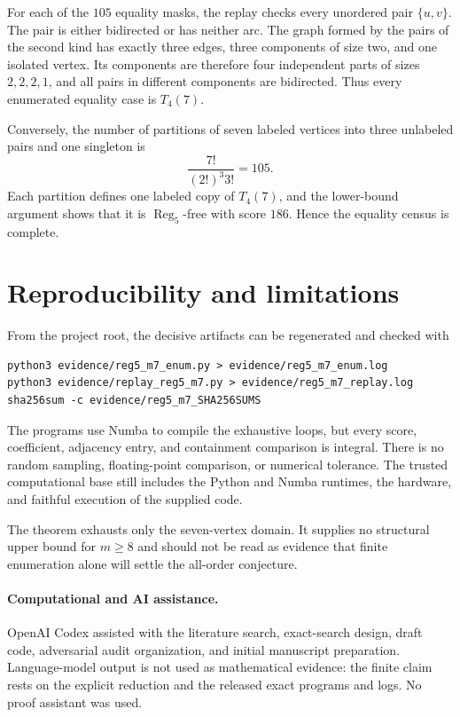 \documentclass[11pt]{article}
\newcommand{\Reg}{\operatorname{Reg}_5}
\begin{document}
For each of the $105$ equality masks, the replay checks every unordered pair
$\{u,v\}$.  The pair is either bidirected or has neither arc.  The graph formed
by the pairs of the second kind has exactly three edges, three components of
size two, and one isolated vertex.  Its components are therefore four
independent parts of sizes $2,2,2,1$, and all pairs in different components
are bidirected.  Thus every enumerated equality case is $T_4(7)$.

Conversely, the number of partitions of seven labeled vertices into three
unlabeled pairs and one singleton is
\[
 \frac{7!}{(2!)^3 3!}=105.
\]
Each partition defines one labeled copy of $T_4(7)$, and the lower-bound
argument shows that it is $\Reg$-free with score $186$.  Hence the equality
census is complete.

\section{Reproducibility and limitations}

From the project root, the decisive artifacts can be regenerated and checked
with
\begin{verbatim}
python3 evidence/reg5_m7_enum.py > evidence/reg5_m7_enum.log
python3 evidence/replay_reg5_m7.py > evidence/reg5_m7_replay.log
sha256sum -c evidence/reg5_m7_SHA256SUMS
\end{verbatim}
The programs use Numba to compile the exhaustive loops, but every score,
coefficient, adjacency entry, and containment comparison is integral.  There
is no random sampling, floating-point comparison, or numerical tolerance.
The trusted computational base still includes the Python and Numba runtimes,
the hardware, and faithful execution of the supplied code.

The theorem exhausts only the seven-vertex domain.  It supplies no structural
upper bound for $m\geq8$ and should not be read as evidence that finite
enumeration alone will settle the all-order conjecture.

\paragraph{Computational and AI assistance.}
OpenAI Codex assisted with the literature search, exact-search design, draft
code, adversarial audit organization, and initial manuscript preparation.
Language-model output is not used as mathematical evidence: the finite claim
rests on the explicit reduction and the released exact programs and logs.  No
proof assistant was used.



\end{document}
